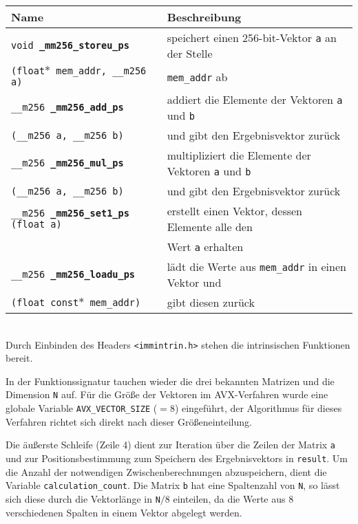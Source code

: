 \documentclass[a4paper,11pt]{scrartcl}
\begin{document}
\begin{tabular}{| l | l |}
\hline
Name & Beschreibung \\ \hline
  
\texttt{void \textbf{\_mm256\_storeu\_ps}} & speichert einen 256-bit-Vektor \texttt{a} an der Stelle\\
\texttt{(float$*$ mem\_addr, \_\_m256 a)} &  \texttt{mem\_addr} ab   \\ \hline

\texttt{\_\_m256 \textbf{\_mm256\_add\_ps}} & addiert die Elemente der Vektoren \texttt{a} und 
\texttt{b} \\
\texttt{(\_\_m256 a, \_\_m256 b)} & und gibt den Ergebnisvektor zurück \\ \hline

\texttt{\_\_m256 \textbf{\_mm256\_mul\_ps}} & multipliziert die Elemente der Vektoren \texttt{a} und \texttt{b} \\
\texttt{(\_\_m256 a, \_\_m256 b)} & und gibt den Ergebnisvektor zurück \\ \hline

\texttt{\_\_m256 \textbf{\_mm256\_set1\_ps} (float a)} & erstellt einen Vektor, dessen Elemente alle den 
\\
& Wert \texttt{a} erhalten \\ \hline

\texttt{\_\_m256 \textbf{\_mm256\_loadu\_ps}} & lädt die Werte aus \texttt{mem\_addr} in einen Vektor und \\
\texttt{(float const$*$ mem\_addr)} & gibt diesen zurück \\ \hline
\end{tabular}\\

Durch Einbinden des Headers \texttt{<immintrin.h>} stehen die intrinsischen Funktionen bereit.



In der Funktionssignatur tauchen wieder die drei bekannten Matrizen und die Dimension \texttt{N} auf.
Für die Größe der Vektoren im AVX-Verfahren wurde eine globale Variable \texttt{AVX\_VECTOR\_SIZE} ($=8$)
eingeführt, der Algorithmus für dieses Verfahren richtet sich direkt nach dieser Größeneinteilung.
\newline

Die äußerste Schleife (Zeile 4) dient zur Iteration über die Zeilen der Matrix \texttt{a}
und zur Positionsbestimmung zum Speichern des Ergebnisvektors in \texttt{result}.
Um die Anzahl der notwendigen Zwischenberechnungen abzuspeichern, dient die Variable
\texttt{calculation\_count}. Die Matrix \texttt{b} hat eine Spaltenzahl von \texttt{N},
so lässt sich diese durch die Vektorlänge in \texttt{N}$/8$ einteilen, da die Werte aus 
$8$ verschiedenen Spalten in einem Vektor abgelegt werden.\newline
\end{document}
